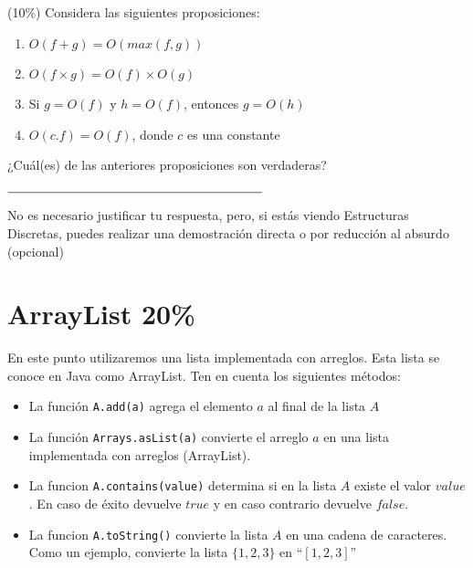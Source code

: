 \documentclass[10 pt]{article}
\begin{document}
\begin{multicols}{2}
\subsection{} (10\%) Considera las siguientes proposiciones:
\begin{enumerate}[label=\Alph*]
	\item $O(f + g) = O(max(f,g))$
	\item $O(f \times g) = O(f) \times O(g)$
	\item Si $g = O(f)$ y $h = O(f)$, entonces $g = O(h)$
	\item $O(c.f) = O(f)$, donde $c$ es una constante
\end{enumerate}
¿Cuál(es) de las anteriores proposiciones son verdaderas?  \\ \\
$\rule{7cm}{0.15mm}$

No es necesario 
justificar tu respuesta, pero, si estás viendo Estructuras Discretas, puedes
realizar una demostración directa o por reducción al absurdo (opcional)
\section{ArrayList 20\%}
En este punto utilizaremos una lista implementada con arreglos. 
Esta lista se conoce en Java como ArrayList. Ten en cuenta los
siguientes métodos:

\begin{itemize}
	\item La función \texttt{A.add(a)} agrega el elemento $a$ al final de la lista $A$
	\item La función \texttt{Arrays.asList(a)} convierte el arreglo $a$ en una lista implementada con arreglos (ArrayList). 
	\item La funcion \texttt{A.contains(value)} determina si en la lista $A$ existe el valor $value$. En caso de éxito devuelve $true$ y en caso contrario devuelve $false$.
	\item La funcion \texttt{A.toString()} convierte la lista $A$ en una cadena de caracteres.  Como un ejemplo, convierte la lista $\{1,2,3\}$ en ``$\left[1, 2 ,3\right]$''
\end{itemize}


\end{multicols}
\end{document}
